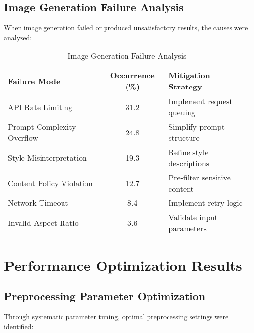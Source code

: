 \subsection{Image Generation Failure Analysis}

When image generation failed or produced unsatisfactory results, the causes were analyzed:

\begin{table}[h!]
\centering
\caption{Image Generation Failure Analysis}
\label{tab:generation-failures}
\begin{tabular}{|l|c|l|}
\hline
\textbf{Failure Mode} & \textbf{Occurrence (\%)} & \textbf{Mitigation Strategy} \\
\hline
API Rate Limiting & 31.2 & Implement request queuing \\
Prompt Complexity Overflow & 24.8 & Simplify prompt structure \\
Style Misinterpretation & 19.3 & Refine style descriptions \\
Content Policy Violation & 12.7 & Pre-filter sensitive content \\
Network Timeout & 8.4 & Implement retry logic \\
Invalid Aspect Ratio & 3.6 & Validate input parameters \\
\hline
\end{tabular}
\end{table}

\section{Performance Optimization Results}
\label{sec:optimization-results}

\subsection{Preprocessing Parameter Optimization}

Through systematic parameter tuning, optimal preprocessing settings were identified:

\begin{table}[h!]
\centering
\caption{Optimal Preprocessing Parameters for Different Content Types}
\label{tab:optimal-parameters}
\end{table}

